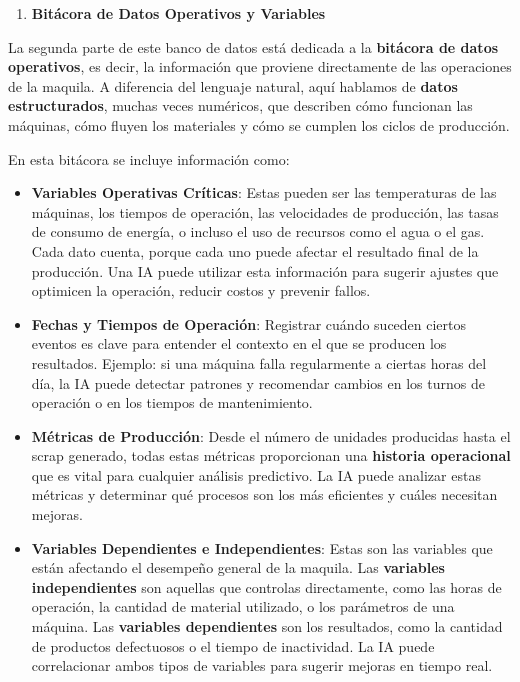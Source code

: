 \documentclass[
  10pt,
  letterpaper,
]{book}
\providecommand{\tightlist}{%
  \setlength{\itemsep}{0pt}\setlength{\parskip}{0pt}}\usepackage{longtable,booktabs,array}
\begin{document}
\begin{enumerate}
\def\labelenumi{\arabic{enumi}.}
\setcounter{enumi}{1}
\tightlist
\item
  \textbf{Bitácora de Datos Operativos y Variables}
\end{enumerate}

La segunda parte de este banco de datos está dedicada a la
\textbf{bitácora de datos operativos}, es decir, la información que
proviene directamente de las operaciones de la maquila. A diferencia del
lenguaje natural, aquí hablamos de \textbf{datos estructurados}, muchas
veces numéricos, que describen cómo funcionan las máquinas, cómo fluyen
los materiales y cómo se cumplen los ciclos de producción.

En esta bitácora se incluye información como:

\begin{itemize}
\item
  \textbf{Variables Operativas Críticas}: Estas pueden ser las
  temperaturas de las máquinas, los tiempos de operación, las
  velocidades de producción, las tasas de consumo de energía, o incluso
  el uso de recursos como el agua o el gas. Cada dato cuenta, porque
  cada uno puede afectar el resultado final de la producción. Una IA
  puede utilizar esta información para sugerir ajustes que optimicen la
  operación, reducir costos y prevenir fallos.
\item
  \textbf{Fechas y Tiempos de Operación}: Registrar cuándo suceden
  ciertos eventos es clave para entender el contexto en el que se
  producen los resultados. Ejemplo: si una máquina falla regularmente a
  ciertas horas del día, la IA puede detectar patrones y recomendar
  cambios en los turnos de operación o en los tiempos de mantenimiento.
\item
  \textbf{Métricas de Producción}: Desde el número de unidades
  producidas hasta el scrap generado, todas estas métricas proporcionan
  una \textbf{historia operacional} que es vital para cualquier análisis
  predictivo. La IA puede analizar estas métricas y determinar qué
  procesos son los más eficientes y cuáles necesitan mejoras.
\item
  \textbf{Variables Dependientes e Independientes}: Estas son las
  variables que están afectando el desempeño general de la maquila. Las
  \textbf{variables independientes} son aquellas que controlas
  directamente, como las horas de operación, la cantidad de material
  utilizado, o los parámetros de una máquina. Las \textbf{variables
  dependientes} son los resultados, como la cantidad de productos
  defectuosos o el tiempo de inactividad. La IA puede correlacionar
  ambos tipos de variables para sugerir mejoras en tiempo real.
\end{itemize}
\end{document}
